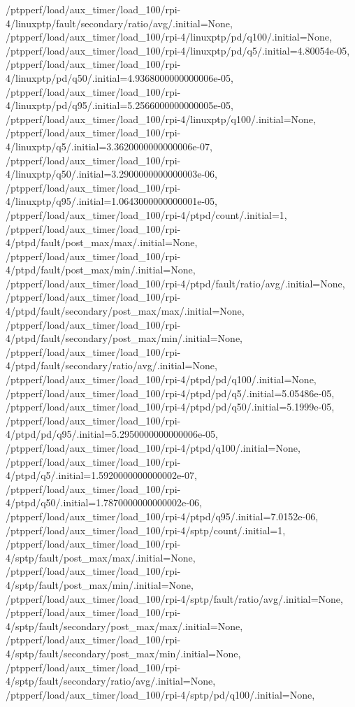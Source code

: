 {    /ptpperf/load/aux_timer/load_100/rpi-4/linuxptp/fault/secondary/ratio/avg/.initial=None,
    /ptpperf/load/aux_timer/load_100/rpi-4/linuxptp/pd/q100/.initial=None,
    /ptpperf/load/aux_timer/load_100/rpi-4/linuxptp/pd/q5/.initial=4.80054e-05,
    /ptpperf/load/aux_timer/load_100/rpi-4/linuxptp/pd/q50/.initial=4.9368000000000006e-05,
    /ptpperf/load/aux_timer/load_100/rpi-4/linuxptp/pd/q95/.initial=5.2566000000000005e-05,
    /ptpperf/load/aux_timer/load_100/rpi-4/linuxptp/q100/.initial=None,
    /ptpperf/load/aux_timer/load_100/rpi-4/linuxptp/q5/.initial=3.3620000000000006e-07,
    /ptpperf/load/aux_timer/load_100/rpi-4/linuxptp/q50/.initial=3.2900000000000003e-06,
    /ptpperf/load/aux_timer/load_100/rpi-4/linuxptp/q95/.initial=1.0643000000000001e-05,
    /ptpperf/load/aux_timer/load_100/rpi-4/ptpd/count/.initial=1,
    /ptpperf/load/aux_timer/load_100/rpi-4/ptpd/fault/post_max/max/.initial=None,
    /ptpperf/load/aux_timer/load_100/rpi-4/ptpd/fault/post_max/min/.initial=None,
    /ptpperf/load/aux_timer/load_100/rpi-4/ptpd/fault/ratio/avg/.initial=None,
    /ptpperf/load/aux_timer/load_100/rpi-4/ptpd/fault/secondary/post_max/max/.initial=None,
    /ptpperf/load/aux_timer/load_100/rpi-4/ptpd/fault/secondary/post_max/min/.initial=None,
    /ptpperf/load/aux_timer/load_100/rpi-4/ptpd/fault/secondary/ratio/avg/.initial=None,
    /ptpperf/load/aux_timer/load_100/rpi-4/ptpd/pd/q100/.initial=None,
    /ptpperf/load/aux_timer/load_100/rpi-4/ptpd/pd/q5/.initial=5.05486e-05,
    /ptpperf/load/aux_timer/load_100/rpi-4/ptpd/pd/q50/.initial=5.1999e-05,
    /ptpperf/load/aux_timer/load_100/rpi-4/ptpd/pd/q95/.initial=5.2950000000000006e-05,
    /ptpperf/load/aux_timer/load_100/rpi-4/ptpd/q100/.initial=None,
    /ptpperf/load/aux_timer/load_100/rpi-4/ptpd/q5/.initial=1.5920000000000002e-07,
    /ptpperf/load/aux_timer/load_100/rpi-4/ptpd/q50/.initial=1.7870000000000002e-06,
    /ptpperf/load/aux_timer/load_100/rpi-4/ptpd/q95/.initial=7.0152e-06,
    /ptpperf/load/aux_timer/load_100/rpi-4/sptp/count/.initial=1,
    /ptpperf/load/aux_timer/load_100/rpi-4/sptp/fault/post_max/max/.initial=None,
    /ptpperf/load/aux_timer/load_100/rpi-4/sptp/fault/post_max/min/.initial=None,
    /ptpperf/load/aux_timer/load_100/rpi-4/sptp/fault/ratio/avg/.initial=None,
    /ptpperf/load/aux_timer/load_100/rpi-4/sptp/fault/secondary/post_max/max/.initial=None,
    /ptpperf/load/aux_timer/load_100/rpi-4/sptp/fault/secondary/post_max/min/.initial=None,
    /ptpperf/load/aux_timer/load_100/rpi-4/sptp/fault/secondary/ratio/avg/.initial=None,
    /ptpperf/load/aux_timer/load_100/rpi-4/sptp/pd/q100/.initial=None,
}
